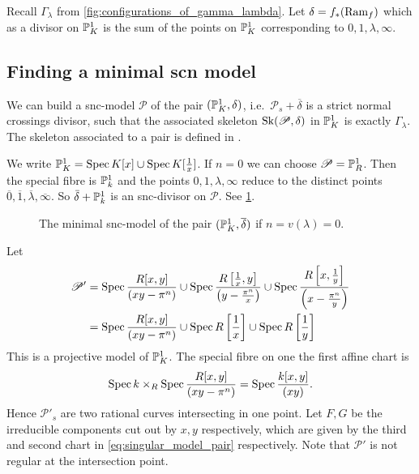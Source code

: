 Recall $\Gamma_\lambda$ from \cref{fig:configurations_of_gamma_lambda}. 
Let $\delta = f_* (\operatorname{Ram}_f)$ which as a divisor on $\mathbb{P}^{1}_K$ is the sum of the points on $\mathbb{P}^{1}_K$ corresponding to $0, 1, \lambda, \infty$. 
\subsection{Finding a minimal scn model} \label{sec:finding_a_minimal_scn_model}
We can build a snc-model $\mathscr P$ of the pair $(\mathbb{P}^{1}_K, \delta)$, i.e.\ $\mathscr P_s + \overline{\delta}$ is a strict normal crossings divisor, such that the associated skeleton $\operatorname{Sk}(\mathscr P, \delta)$ in $\mathbb{P}^{1}_K$ is exactly $\Gamma_\lambda$. 
The skeleton associated to a pair is defined in \cite[§3.2.1]{bakerWeightFunctionsBerkovich2016}.

We write $\mathbb{P}^{1}_K = \operatorname{Spec} K[x] \cup \operatorname{Spec} K[\frac{1}{x}]$.
If $n = 0$ we can choose $\mathscr P = \mathbb{P}^{1}_R$. Then the special fibre is $\mathbb{P}^{1}_k$ and the points $0, 1, \lambda, \infty$ reduce to the distinct points $\overline{0}, \overline{1}, \overline{\lambda}, \overline{\infty}$.
So $\bar{\delta} + \mathbb{P}^{1}_k$ is an snc-divisor on $\mathscr P$. 
See \cref{fig:model_pair_n_1}. 
\begin{figure}[h]
    \centering
    \caption{The minimal snc-model of the pair $(\mathbb{P}^{1}_K, \overline{\delta})$ if $n =v(\lambda) = 0$.}
    \label{fig:model_pair_n_1}
\end{figure}

Let 
\begin{align}\label{eq:singular_model_pair}
	\mathscr P' &= \operatorname{Spec} \frac{R[x, y]}{(xy - \pi^{n})} \cup \operatorname{Spec} \frac{R\left[ \frac{1}{x},y \right]}{\left(y-\frac{\pi^{n}}{x}\right)} \cup \operatorname{Spec} \frac{R\left[x, \frac{1}{y}\right]}{\left(x - \frac{\pi^{n}}{y}\right)} \\
	&=  \operatorname{Spec} \frac{R[x, y]}{(xy - \pi^{n})} \cup \operatorname{Spec} R\left[ \frac{1}{x} \right] \cup \operatorname{Spec} R\left[ \frac{1}{y}\right] \nonumber 
 \end{align} 
This is a projective model of $\mathbb{P}^{1}_K$. 
The special fibre on one the first affine chart is \[
	\operatorname{Spec} k \times _{R} \operatorname{Spec} \frac{R[x, y]}{(xy -\pi^{n})}=\operatorname{Spec}  \frac{k[x, y]}{(xy)}
.\] 
Hence $\mathscr P'_s$ are two rational curves intersecting in one point. 
Let $F, G$ be the irreducible components cut out by $x, y$ respectively, which are given by the third and second chart in \eqref{eq:singular_model_pair} respectively. 
Note that $\mathscr P'$ is not regular at the intersection point.

